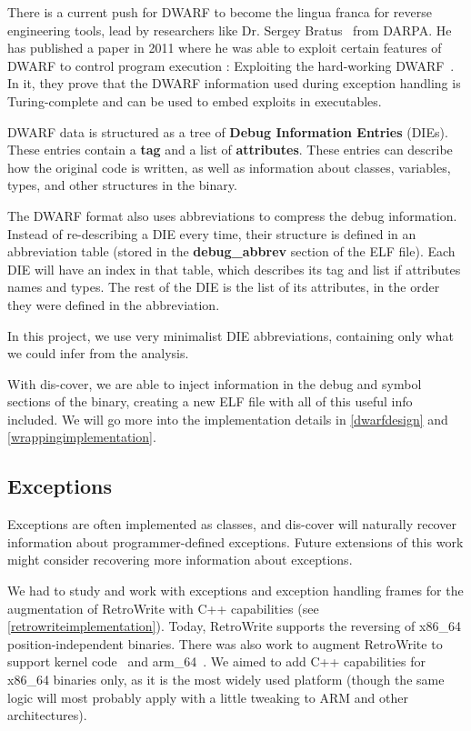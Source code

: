 \documentclass[a4paper,11pt,oneside]{report}
\begin{document}
There is a current push for DWARF to become the lingua franca for reverse 
engineering tools, lead by researchers like Dr. Sergey Bratus~\cite{bratus} 
from DARPA.
He has published a paper in 2011 where he was able to exploit certain features 
of DWARF to control program execution : Exploiting the hard-working 
DWARF~\cite{hardworkingdwarf}.
In it, they prove that the DWARF information used during exception handling
is Turing-complete and can be used to embed exploits in executables.

DWARF data is structured as a tree of \textbf{Debug Information Entries} 
(DIEs). These entries contain a \textbf{tag} and a list of
\textbf{attributes}.
These entries can describe how the original code is written, as well as
information about classes, variables, types, and other structures in the
binary.

The DWARF format also uses abbreviations to compress the debug information.
Instead of re-describing a DIE every time, their structure is defined in an
abbreviation table (stored in the \textbf{debug\_abbrev} section of the ELF
file).
Each DIE will have an index in that table, which describes its tag and list
if attributes names and types. The rest of the DIE is the list of its
attributes, in the order they were defined in the abbreviation.

In this project, we use very minimalist DIE abbreviations, containing only
what we could infer from the analysis.

With dis-cover, we are able to inject information in the debug and symbol 
sections of the binary, creating a new ELF file with all of this useful info 
included.
We will go more into the implementation details in \autoref{dwarfdesign} and
\autoref{wrappingimplementation}.

\subsection{Exceptions}

Exceptions are often implemented as classes, and dis-cover will naturally 
recover information about programmer-defined exceptions.
Future extensions of this work might consider recovering more information about 
exceptions.

We had to study and work with exceptions and exception handling frames for 
the augmentation of RetroWrite with C++ capabilities (see
\autoref{retrowriteimplementation}).
Today, RetroWrite supports the reversing of x86\_64 position-independent 
binaries.
There was also work to augment RetroWrite to support kernel 
code~\cite{rwkernel} and arm\_64~\cite{rwarm}.
We aimed to add C++ capabilities for x86\_64 binaries only, as it is the most 
widely used platform (though the same logic will most probably apply with a 
little tweaking to ARM and other architectures).
\end{document}
